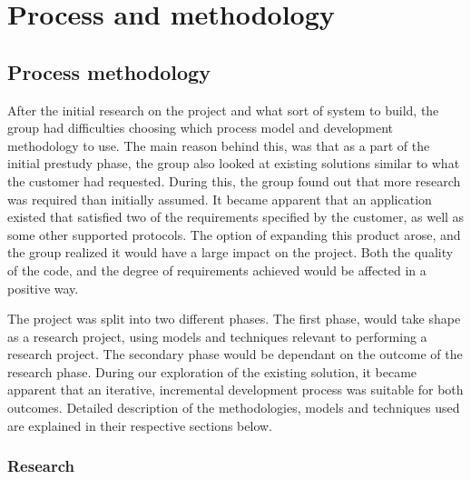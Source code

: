 
\chapter{Process and methodology}

\section{Process methodology}

After the initial research on the project and what sort of system to build, the group had difficulties choosing which process model and development methodology to use. The main reason behind this, was that as a part of the initial prestudy phase, the group also looked at existing solutions similar to what the customer had requested. During this, the group found out that more research was required than initially assumed. It became apparent that an application existed that satisfied two of the requirements specified by the customer, as well as some other supported protocols. The option of expanding this product arose, and the group realized it would have a large impact on the project. Both the quality of the code, and the degree of requirements achieved would be affected in a positive way.

The project was split into two different phases. The first phase, would take shape as a research project, using models and techniques relevant to performing a research project. The secondary phase would be dependant on the outcome of the research phase. During our exploration of the existing solution, it became apparent that an iterative, incremental development process was suitable for both outcomes. Detailed description of the methodologies, models and techniques used are explained in their respective sections below.

\subsection{Research}

